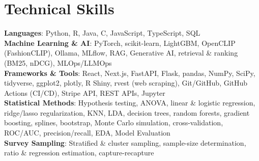 \documentclass[letterpaper,10pt]{article}
\begin{document}
\section{Technical Skills}
 \begin{itemize}[leftmargin=0.15in, label={}]
    \small{\item{
     \textbf{Languages}{: Python, R, Java, C, JavaScript, TypeScript, SQL} \\
     \textbf{Machine Learning \& AI}{: PyTorch, scikit-learn, LightGBM, OpenCLIP (FashionCLIP), Ollama, MLflow, RAG, Generative AI, retrieval \& ranking (BM25, nDCG), MLOps/LLMOps} \\
     \textbf{Frameworks \& Tools}{: React, Next.js, FastAPI, Flask, pandas, NumPy, SciPy, tidyverse, ggplot2, plotly, R Shiny, rvest (web scraping), Git/GitHub, GitHub Actions (CI/CD), Stripe API, REST APIs, Jupyter} \\
     \textbf{Statistical Methods}{: Hypothesis testing, ANOVA, linear \& logistic regression, ridge/lasso regularization, KNN, LDA, decision trees, random forests, gradient boosting, splines, bootstrap, Monte Carlo simulation, cross-validation, ROC/AUC, precision/recall, EDA, Model Evaluation} \\
     \textbf{Survey Sampling}{: Stratified \& cluster sampling, sample-size determination, ratio \& regression estimation, capture-recapture}
    }}
 \end{itemize}


\end{document}
